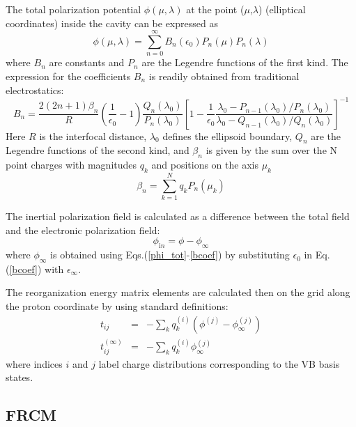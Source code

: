 \documentclass[oneside,11pt,openany]{book}
\begin{document}
\par
The total polarization potential $\phi(\mu,\lambda)$ at the point ($\mu$,$\lambda$) (elliptical coordinates) inside the cavity
can be expressed as\cite{Kirkwood38}
\begin{equation}
\phi(\mu,\lambda)=\sum_{n=0}^{\infty}B_n(\epsilon_0)P_n(\mu)P_n(\lambda)
\label{phi_tot}
\end{equation}
where $B_n$ are constants and $P_n$ are the Legendre functions
of the first kind. The expression for the coefficients $B_n$
is readily obtained from traditional electrostatics:
\begin{equation}
B_n=\frac{2(2n+1)\beta_n}{R}\left(\frac{1}{\epsilon_0}-1\right)
\frac{Q_n(\lambda_0)}{P_n(\lambda_0)}
\left[1-\frac{1}{\epsilon_0}
\frac{\lambda_0-P_{n-1}(\lambda_0)/P_n(\lambda_0)}
     {\lambda_0-Q_{n-1}(\lambda_0)/Q_n(\lambda_0)}
\right]^{-1}
\label{bcoef}
\end{equation}
Here $R$ is the interfocal distance, $\lambda_0$ defines the
ellipsoid boundary, $Q_n$ are the Legendre functions of the
second kind, and $\beta_n$ is given by the sum over the N
point charges with magnitudes $q_k$ and positions on the axis
$\mu_k$
\begin{equation}
\beta_n=\sum_{k=1}^N q_kP_n(\mu_k)
\label{beta}
\end{equation}
\par
The inertial polarization field is calculated as a difference
between the total field and the electronic polarization field:
\begin{equation}
\phi_{\mathrm in} = \phi - \phi_{\infty}
\label{phi_in}
\end{equation}
where $\phi_{\infty}$ is obtained using
Eqs.(\ref{phi_tot}-\ref{bcoef}) by substituting $\epsilon_0$
in Eq.(\ref{bcoef}) with $\epsilon_{\infty}$.
\par
The reorganization energy matrix elements are calculated
then on the grid along the proton coordinate by using standard definitions\cite{pcet-jcp1}:
\begin{eqnarray}
t_{ij} &=& -\sum_k q_k^{(i)}(\phi^{(j)}-\phi^{(j)}_{\infty}) \\
t_{ij}^{(\infty)} &=& -\sum_k q_k^{(i)}\phi^{(j)}_{\infty}
\label{tmat}
\end{eqnarray}
where indices $i$ and $j$ label charge distributions corresponding
to the VB basis states.


\subsection{FRCM}
\end{document}
